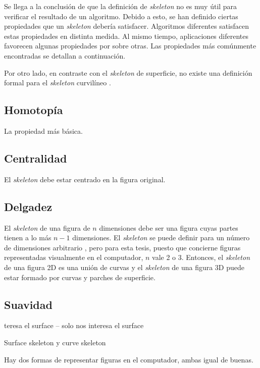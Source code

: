 Se llega a la conclusión de que la definición de \textit{skeleton} no es muy útil para verificar el resultado de un algoritmo. Debido a esto, se han definido ciertas propiedades que un \textit{skeleton} debería satisfacer. Algoritmos diferentes satisfacen estas propiedades en distinta medida. Al mismo tiempo, aplicaciones diferentes favorecen algunas propiedades por sobre otras. Las propiedades más comúnmente encontradas \cite{cornea2007curve,tagliasacchi2012mean} se detallan a continuación.

Por otro lado, en contraste con el \textit{skeleton} de superficie, no existe una definición formal para el \textit{skeleton} curvilíneo \cite{reniers2008computing}.

\subsection{Homotopía}

La propiedad más básica.

\subsection{Centralidad}

El \textit{skeleton} debe estar centrado en la figura original.

\subsection{Delgadez}

El \textit{skeleton} de una figura de $n$ dimensiones debe ser una figura cuyas partes tienen a lo más $n-1$ dimensiones. El \textit{skeleton} se puede definir para un número de dimensiones arbitrario \cite{Lieutier20041029}, pero para esta tesis, puesto que concierne figuras representadas visualmente en el computador, $n$ vale 2 o 3. Entonces, el \textit{skeleton} de una figura 2D es una unión de curvas y el \textit{skeleton} de una figura 3D puede estar formado por curvas y parches de superficie.

\subsection{Suavidad}

teresa el surface
-- solo nos interesa el surface

Surface skeleton y curve skeleton

Hay dos formas de representar figuras en el computador, ambas igual de buenas.

